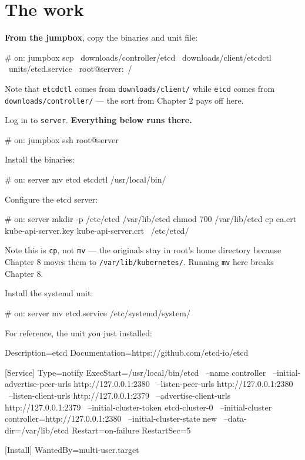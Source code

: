\documentclass[11pt,oneside]{report}
\begin{document}
\hypertarget{the-work-6}{%
\section{The
work}\label{the-work-6}}

\textbf{From the
jumpbox}, copy the
binaries and unit
file:

\begin{cmdlst}
# on: jumpbox
scp \
  downloads/controller/etcd \
  downloads/client/etcdctl \
  units/etcd.service \
  root@server:~/
\end{cmdlst}

Note that
\texttt{etcdctl}
comes from
\texttt{downloads/}\allowbreak{}\texttt{client/}\allowbreak{}
while \texttt{etcd}
comes from
\texttt{downloads/}\allowbreak{}\texttt{controller/}\allowbreak{}
--- the sort from
Chapter 2 pays off
here.

Log in to
\texttt{server}.
\textbf{Everything
below runs there.}

\begin{cmdlst}
# on: jumpbox
ssh root@server
\end{cmdlst}

Install the
binaries:

\begin{cmdlst}
# on: server
{
  mv etcd etcdctl /usr/local/bin/
}
\end{cmdlst}

Configure the etcd
server:

\begin{cmdlst}
# on: server
{
  mkdir -p /etc/etcd /var/lib/etcd
  chmod 700 /var/lib/etcd
  cp ca.crt kube-api-server.key kube-api-server.crt \
    /etc/etcd/
}
\end{cmdlst}

Note this is
\texttt{cp}, not
\texttt{mv} --- the
originals stay in
root's home
directory because
Chapter 8 moves them
to
\texttt{/}\allowbreak{}\texttt{var/}\allowbreak{}\texttt{lib/}\allowbreak{}\texttt{kubernetes/}\allowbreak{}.
Running \texttt{mv}
here breaks Chapter
8.

Install the systemd
unit:

\begin{cmdlst}
# on: server
mv etcd.service /etc/systemd/system/
\end{cmdlst}

For reference, the
unit you just
installed:

\begin{outlst}
[Unit]
Description=etcd
Documentation=https://github.com/etcd-io/etcd

[Service]
Type=notify
ExecStart=/usr/local/bin/etcd \
  --name controller \
  --initial-advertise-peer-urls http://127.0.0.1:2380 \
  --listen-peer-urls http://127.0.0.1:2380 \
  --listen-client-urls http://127.0.0.1:2379 \
  --advertise-client-urls http://127.0.0.1:2379 \
  --initial-cluster-token etcd-cluster-0 \
  --initial-cluster controller=http://127.0.0.1:2380 \
  --initial-cluster-state new \
  --data-dir=/var/lib/etcd
Restart=on-failure
RestartSec=5

[Install]
WantedBy=multi-user.target
\end{outlst}
\end{document}
